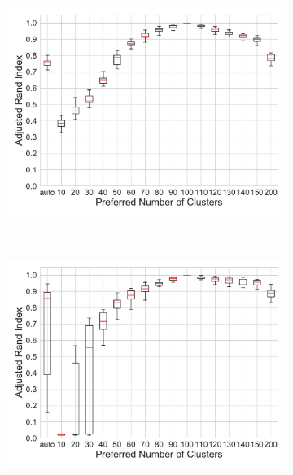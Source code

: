 \documentclass[varwidth, border=0pt]{standalone}
\begin{document}
\begin{figure}[H]
\begin{subfigure}{0.5\linewidth}
		\includegraphics[width=\linewidth]{../../graphics/preferred_number_of_modules_rand_us}
	\end{subfigure}~%
	\begin{subfigure}{0.5\linewidth}
		\includegraphics[width=\linewidth]{../../graphics/preferred_number_of_modules_rand_de}
	\end{subfigure}

\end{figure}
	
\end{document}
